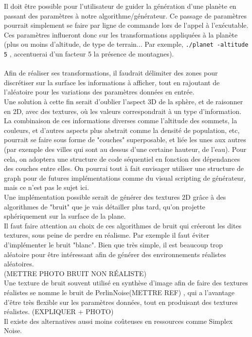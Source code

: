 \documentclass[a4paper]{article}
\begin{document}
Il doit être possible pour l'utilisateur de guider la génération d'une planète en passant des paramètres à notre algorithme/générateur. Ce passage de paramètres pourrait simplement se faire par ligne de commande lors de l'appel à l'exécutable. Ces paramètres influeront donc sur les transformations appliquées à la planète (plus ou moins d'altitude, de type de terrain... Par exemple, \verb|./planet -altitude 5| , accentuerai d'un facteur 5 la présence de montagnes).\\
\\
Afin de réaliser ses transformations, il faudrait délimiter des zones pour discrétiser sur la surface les informations à afficher, tout en rajoutant de l'aléatoire pour les variations des paramètres données en entrée.\\
Une solution à cette fin serait d'oublier l'aspect 3D de la sphère, et de raisonner en 2D, avec des textures, où les valeurs correspondrait à un type d'information. La combinaison de ces informations diverses comme l'altitude des sommets, la couleurs, et d'autres aspects plus abstrait comme la densité de population, etc, pourrait se faire sous forme de "couches" superposable, et liée les unes aux autres (par exemple des villes qui sont au dessus d'une certaine hauteur, de l'eau). Pour cela, on adoptera une structure de code séquentiel en fonction des dépendances des couches entre elles. On pourrai tout à fait envisager utiliser une structure de graph pour de futures implémentations comme du visual scripting de générateur, mais ce n'est pas le sujet ici. \\
Une implémentation possible serait de générer des textures 2D grâce à des algorithmes de "bruit" que je vais détailler plus tard, qu'on projette sphériquement sur la surface de la plane.\\
Il faut faire attention au choix de ces algorithmes de bruit qui créeront les dites textures, sous peine de perdre en réalisme. Par exemple il faut éviter d'implémenter le bruit "blanc". Bien que très simple, il est beaucoup trop aléatoire pour être intéressant afin de générer des environnements réalistes aléatoires.\\
(METTRE PHOTO BRUIT NON RÉALISTE)\\
Une texture de bruit souvent utilisé en synthèse d'image afin de faire des textures réalistes se nomme le bruit de  PerlinNoise(METTRE REF) , qui a l'avantage d'être très flexible sur les paramètres données, tout en produisant des textures réalistes.
(EXPLIQUER + PHOTO)\\
Il existe des alternatives aussi moins coûteuses en ressources comme Simplex Noise.\\
\end{document}
